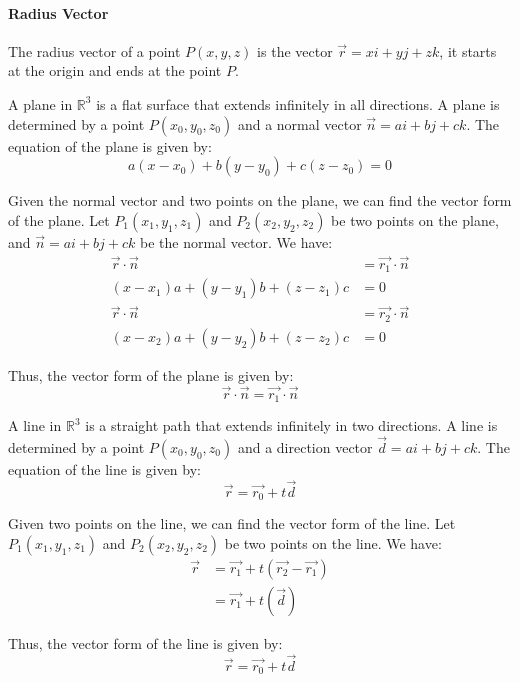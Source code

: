 \documentclass[11pt]{report}
\begin{document}
\paragraph{Radius Vector} The radius vector of a point $P(x, y, z)$ is the vector $\vec{r} = xi + yj + zk$, it starts at the origin and ends at the point $P$.
\begin{definition}[Planes]
    A plane in $\mathbb{R}^3$ is a flat surface that extends infinitely in all directions. A plane is determined by a point $P(x_0, y_0, z_0)$ and a normal vector $\vec{n} = ai + bj + ck$. The equation of the plane is given by:
    \begin{equation}
        a(x-x_0) + b(y-y_0) + c(z-z_0) = 0
    \end{equation}
\end{definition}
\begin{example}
    Given the normal vector and two points on the plane, we can find the vector form of the plane. Let $P_1(x_1, y_1, z_1)$ and $P_2(x_2, y_2, z_2)$ be two points on the plane, and $\vec{n} = ai + bj + ck$ be the normal vector. We have:
    \begin{align*}
        \vec{r} \cdot \vec{n} &= \vec{r_1} \cdot \vec{n} \\
        (x-x_1)a + (y-y_1)b + (z-z_1)c &= 0 \\
        \vec{r} \cdot \vec{n} &= \vec{r_2} \cdot \vec{n} \\
        (x-x_2)a + (y-y_2)b + (z-z_2)c &= 0
    \end{align*}
\end{example}
Thus, the vector form of the plane is given by:
\begin{equation}
    \vec{r} \cdot \vec{n} = \vec{r_1} \cdot \vec{n}
\end{equation}
\begin{definition}[Lines]
    A line in $\mathbb{R}^3$ is a straight path that extends infinitely in two directions. A line is determined by a point $P(x_0, y_0, z_0)$ and a direction vector $\vec{d} = ai + bj + ck$. The equation of the line is given by:
    \begin{equation}
        \vec{r} = \vec{r_0} + t\vec{d}
    \end{equation}
\end{definition}
\begin{example}
    Given two points on the line, we can find the vector form of the line. Let $P_1(x_1, y_1, z_1)$ and $P_2(x_2, y_2, z_2)$ be two points on the line. We have:
    \begin{align*}
        \vec{r} &= \vec{r_1} + t(\vec{r_2} - \vec{r_1}) \\
        &= \vec{r_1} + t(\vec{d})
    \end{align*}
\end{example}
    Thus, the vector form of the line is given by:
    \begin{equation}
        \vec{r} = \vec{r_0} + t\vec{d}
    \end{equation}
\end{document}
